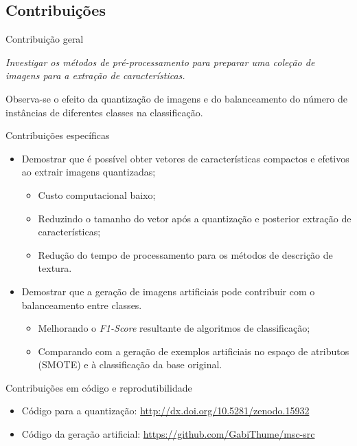 \documentclass{beamer}
\begin{document}
\subsection{Contribuições}
\begin{frame}{Contribuição geral}
\setlength\leftmargini{1em}
\justifying
  \begin{block}{}
  \justifying
  \emph{Investigar os métodos de pré-processamento para preparar uma coleção de imagens para a extração de características.}

  \vspace{5mm}
  Observa-se o efeito da quantização de imagens e do balanceamento do número de instâncias de diferentes classes na classificação.
  \end{block}
\end{frame}
\begin{frame}{Contribuições específicas}
\setlength\leftmargini{1em}
\justifying
    \begin{itemize}
      \item Demostrar que é possível obter vetores de características compactos e efetivos ao extrair imagens quantizadas;
      \begin{itemize}
        \item Custo computacional baixo;
        \item Reduzindo o tamanho do vetor após a quantização e posterior extração de características;
        \item Redução do tempo de processamento para os métodos de descrição de textura.
      \end{itemize}
      \pause
      \item Demostrar que a geração de imagens artificiais pode contribuir com o balanceamento entre classes.
        \begin{itemize}
          \item Melhorando o \textit{F1-Score} resultante de algoritmos de classificação;
          \item Comparando com a geração de exemplos artificiais no espaço de atributos (SMOTE) e à classificação da base original.
        \end{itemize}
    \end{itemize}
\end{frame}
\begin{frame}{Contribuições em código e reprodutibilidade}
  \setlength\leftmargini{1em}
  \justifying
  \begin{itemize}
    \item Código para a quantização: \url{http://dx.doi.org/10.5281/zenodo.15932}
    \item Código da geração artificial: \url{https://github.com/GabiThume/msc-src}
  \end{itemize}
\end{frame}
\end{document}
